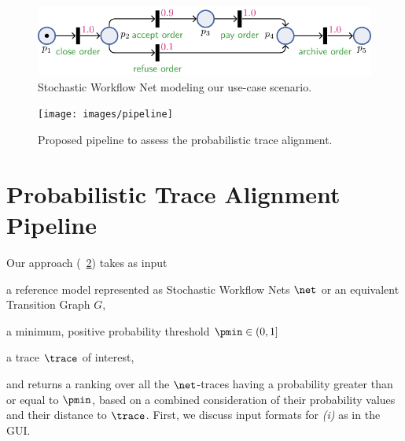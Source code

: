 \begin{figure}[!t]
	\centering
	\includegraphics[width=.49\textwidth]{images/petri_tut.pdf}
	\caption{Stochastic Workflow Net modeling our use-case scenario.}\label{fig:petri_tut}
\end{figure}
\begin{figure}[!t]
	\centering\texttt{[image: images/pipeline]}
	\caption{Proposed pipeline to assess the probabilistic trace alignment.}\label{fig:pipe}
\end{figure}

\section{Probabilistic Trace Alignment Pipeline}
Our approach (\figurename~\ref{fig:pipe}) takes as input
\begin{inparaenum}[\it (i)]
	\item a reference model represented as Stochastic Workflow Nets $\net$ or an equivalent Transition Graph $G$,
	\item a minimum, positive probability threshold $\pmin \in (0,1]$
	\item a trace $\trace$ of interest,
\end{inparaenum}
and returns a ranking over all the $\net$-traces having a probability greater than or equal to $\pmin$, based on a combined consideration of their probability values and their distance to $\trace$. First, we discuss input formats for \textit{(i)} as in the GUI.





